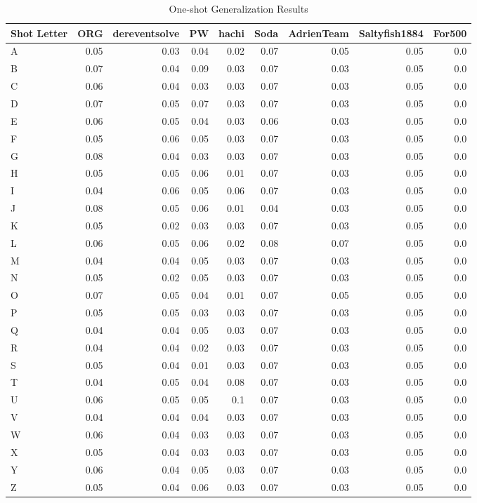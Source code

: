 \begin{table}[h!]
\centering
\begin{tabular}{lrrrrrrrr}
Shot Letter & ORG & dereventsolve & PW & hachi & Soda & AdrienTeam & Saltyfish1884 & For500 \\
\hline
A & 0.05 & 0.03 & 0.04 & 0.02 & 0.07 & 0.05 & 0.05 & 0.0 \\
B & 0.07 & 0.04 & 0.09 & 0.03 & 0.07 & 0.03 & 0.05 & 0.0 \\
C & 0.06 & 0.04 & 0.03 & 0.03 & 0.07 & 0.03 & 0.05 & 0.0 \\
D & 0.07 & 0.05 & 0.07 & 0.03 & 0.07 & 0.03 & 0.05 & 0.0 \\
E & 0.06 & 0.05 & 0.04 & 0.03 & 0.06 & 0.03 & 0.05 & 0.0 \\
F & 0.05 & 0.06 & 0.05 & 0.03 & 0.07 & 0.03 & 0.05 & 0.0 \\
G & 0.08 & 0.04 & 0.03 & 0.03 & 0.07 & 0.03 & 0.05 & 0.0 \\
H & 0.05 & 0.05 & 0.06 & 0.01 & 0.07 & 0.03 & 0.05 & 0.0 \\
I & 0.04 & 0.06 & 0.05 & 0.06 & 0.07 & 0.03 & 0.05 & 0.0 \\
J & 0.08 & 0.05 & 0.06 & 0.01 & 0.04 & 0.03 & 0.05 & 0.0 \\
K & 0.05 & 0.02 & 0.03 & 0.03 & 0.07 & 0.03 & 0.05 & 0.0 \\
L & 0.06 & 0.05 & 0.06 & 0.02 & 0.08 & 0.07 & 0.05 & 0.0 \\
M & 0.04 & 0.04 & 0.05 & 0.03 & 0.07 & 0.03 & 0.05 & 0.0 \\
N & 0.05 & 0.02 & 0.05 & 0.03 & 0.07 & 0.03 & 0.05 & 0.0 \\
O & 0.07 & 0.05 & 0.04 & 0.01 & 0.07 & 0.05 & 0.05 & 0.0 \\
P & 0.05 & 0.05 & 0.03 & 0.03 & 0.07 & 0.03 & 0.05 & 0.0 \\
Q & 0.04 & 0.04 & 0.05 & 0.03 & 0.07 & 0.03 & 0.05 & 0.0 \\
R & 0.04 & 0.04 & 0.02 & 0.03 & 0.07 & 0.03 & 0.05 & 0.0 \\
S & 0.05 & 0.04 & 0.01 & 0.03 & 0.07 & 0.03 & 0.05 & 0.0 \\
T & 0.04 & 0.05 & 0.04 & 0.08 & 0.07 & 0.03 & 0.05 & 0.0 \\
U & 0.06 & 0.05 & 0.05 & 0.1 & 0.07 & 0.03 & 0.05 & 0.0 \\
V & 0.04 & 0.04 & 0.04 & 0.03 & 0.07 & 0.03 & 0.05 & 0.0 \\
W & 0.06 & 0.04 & 0.03 & 0.03 & 0.07 & 0.03 & 0.05 & 0.0 \\
X & 0.05 & 0.04 & 0.03 & 0.03 & 0.07 & 0.03 & 0.05 & 0.0 \\
Y & 0.06 & 0.04 & 0.05 & 0.03 & 0.07 & 0.03 & 0.05 & 0.0 \\
Z & 0.05 & 0.04 & 0.06 & 0.03 & 0.07 & 0.03 & 0.05 & 0.0 \\
\end{tabular}
\caption{One-shot Generalization Results}
\label{tab:one_shot_generalization}
\end{table}